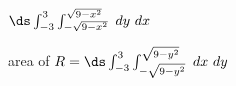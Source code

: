 {$\ds \int_{-3}^3\int_{-\sqrt{9-x^2}}^{\sqrt{9-x^2}} \ dy \ dx$
}
{\noindent \begin{minipage}{\linewidth}
\end{minipage}

area of $R = \ds \int_{-3}^3\int_{-\sqrt{9-y^2}}^{\sqrt{9-y^2}} \ dx \ dy$
}
